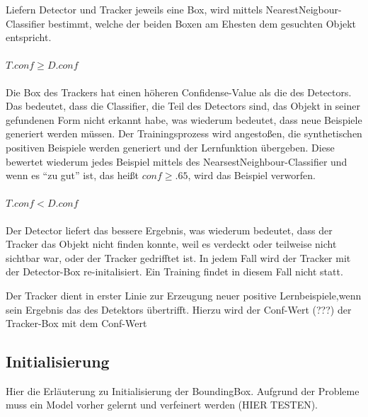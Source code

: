 Liefern Detector und Tracker jeweils eine Box, wird mittels NearestNeigbour-Classifier bestimmt, welche der beiden Boxen am Ehesten dem gesuchten Objekt
entspricht.

\paragraph{$T.conf\geq D.conf$}
Die Box des Trackers hat einen höheren Confidense-Value als die des Detectors. Das bedeutet, dass die Classifier, die Teil des Detectors sind, das Objekt in seiner gefundenen Form nicht erkannt habe, was wiederum bedeutet, dass neue Beispiele generiert werden müssen. Der Trainingsprozess wird angestoßen, die synthetischen positiven Beispiele werden generiert und der Lernfunktion übergeben. Diese bewertet wiederum jedes Beispiel mittels des NearsestNeighbour-Classifier und wenn es ``zu gut'' ist, das heißt $conf\geq.65$, wird das Beispiel verworfen.

\paragraph{$T.conf<D.conf$ }
Der Detector liefert das bessere Ergebnis, was wiederum bedeutet,
dass der Tracker das Objekt nicht finden konnte, weil es verdeckt
oder teilweise nicht sichtbar war, oder der Tracker gedrifftet ist. In jedem Fall wird der Tracker mit der Detector-Box re-initalisiert. Ein Training findet in diesem Fall nicht statt.

Der Tracker dient in erster Linie zur Erzeugung neuer positive Lernbeispiele,wenn sein Ergebnis das des Detektors übertrifft. Hierzu wird der Conf-Wert (???) der Tracker-Box mit dem Conf-Wert

\subsection{Initialisierung}
Hier die Erläuterung zu Initialisierung der BoundingBox. Aufgrund
der Probleme muss ein Model vorher gelernt und verfeinert werden (HIER
TESTEN).